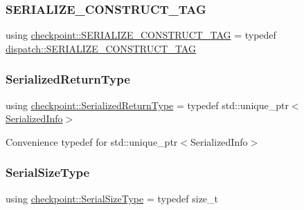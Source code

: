 \mbox{\label{namespacecheckpoint_a7ff642cff4d72d01a16ab10e9bc363ef}} 
\subsubsection{\texorpdfstring{S\+E\+R\+I\+A\+L\+I\+Z\+E\+\_\+\+C\+O\+N\+S\+T\+R\+U\+C\+T\+\_\+\+T\+AG}{SERIALIZE\_CONSTRUCT\_TAG}}
{\footnotesize\ttfamily using \hyperlink{namespacecheckpoint_a7ff642cff4d72d01a16ab10e9bc363ef}{checkpoint\+::\+S\+E\+R\+I\+A\+L\+I\+Z\+E\+\_\+\+C\+O\+N\+S\+T\+R\+U\+C\+T\+\_\+\+T\+AG} = typedef \hyperlink{structcheckpoint_1_1dispatch_1_1_s_e_r_i_a_l_i_z_e___c_o_n_s_t_r_u_c_t___t_a_g}{dispatch\+::\+S\+E\+R\+I\+A\+L\+I\+Z\+E\+\_\+\+C\+O\+N\+S\+T\+R\+U\+C\+T\+\_\+\+T\+AG}}

\mbox{\label{namespacecheckpoint_aa61e2b491f405a63a394f9aad528c37a}} 
\subsubsection{\texorpdfstring{Serialized\+Return\+Type}{SerializedReturnType}}
{\footnotesize\ttfamily using \hyperlink{namespacecheckpoint_aa61e2b491f405a63a394f9aad528c37a}{checkpoint\+::\+Serialized\+Return\+Type} = typedef std\+::unique\+\_\+ptr$<$\hyperlink{structcheckpoint_1_1_serialized_info}{Serialized\+Info}$>$}



Convenience typedef for {\ttfamily std\+::unique\+\_\+ptr$<$\+Serialized\+Info$>$} 

\mbox{\label{namespacecheckpoint_a083f6674da3f94c2901b18c6d238217c}} 
\subsubsection{\texorpdfstring{Serial\+Size\+Type}{SerialSizeType}}
{\footnotesize\ttfamily using \hyperlink{namespacecheckpoint_a083f6674da3f94c2901b18c6d238217c}{checkpoint\+::\+Serial\+Size\+Type} = typedef size\+\_\+t}

